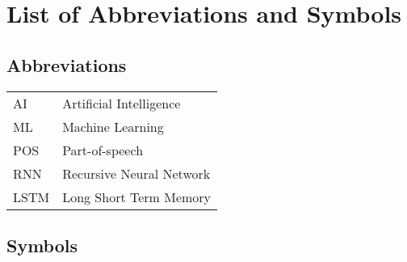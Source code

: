 \chapter{List of Abbreviations and Symbols}
\section*{Abbreviations}
\begin{flushleft}
  \renewcommand{\arraystretch}{1.1}
  \begin{tabularx}{\textwidth}{@{}p{12mm}X@{}}
    AI   & Artificial Intelligence \\
    ML   & Machine Learning \\
    POS  & Part-of-speech \\
    RNN  & Recursive Neural Network \\
    LSTM  & Long Short Term Memory \\
  \end{tabularx}
\end{flushleft}
\section*{Symbols}
\begin{flushleft}
  \renewcommand{\arraystretch}{1.1}
  \begin{tabularx}{\textwidth}{@{}p{12mm}X@{}}
  \end{tabularx}
\end{flushleft}